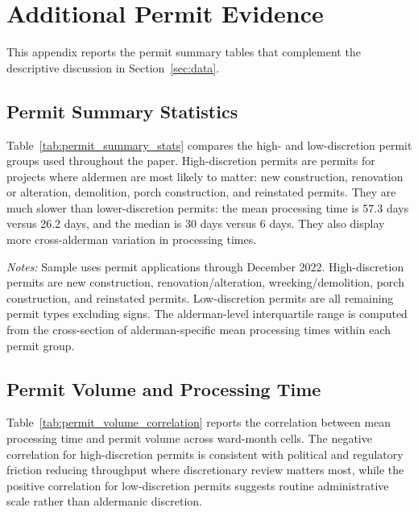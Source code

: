 \section{Additional Permit Evidence}
\label{sec:appendix_permits}

This appendix reports the permit summary tables that complement the descriptive discussion in Section~\ref{sec:data}.

\subsection{Permit Summary Statistics}
\label{app:permit_summary_stats}

Table~\ref{tab:permit_summary_stats} compares the high- and low-discretion permit groups used throughout the paper.
High-discretion permits are permits for projects where aldermen are most likely to matter: new construction, renovation or alteration, demolition, porch construction, and reinstated permits.
They are much slower than lower-discretion permits: the mean processing time is 57.3 days versus 26.2 days, and the median is 30 days versus 6 days.
They also display more cross-alderman variation in processing times.

\begin{table}[htbp]
    \centering
    \caption{Summary Statistics for High- and Low-Discretion Permits}
    \label{tab:permit_summary_stats}
    

    \footnotesize
    \textit{Notes:} Sample uses permit applications through December 2022.
    High-discretion permits are new construction, renovation/alteration, wrecking/demolition, porch construction, and reinstated permits.
    Low-discretion permits are all remaining permit types excluding signs.
    The alderman-level interquartile range is computed from the cross-section of alderman-specific mean processing times within each permit group.
\end{table}

\subsection{Permit Volume and Processing Time}

Table~\ref{tab:permit_volume_correlation} reports the correlation between mean processing time and permit volume across ward-month cells.
The negative correlation for high-discretion permits is consistent with political and regulatory friction reducing throughput where discretionary review matters most, while the positive correlation for low-discretion permits suggests routine administrative scale rather than aldermanic discretion.

